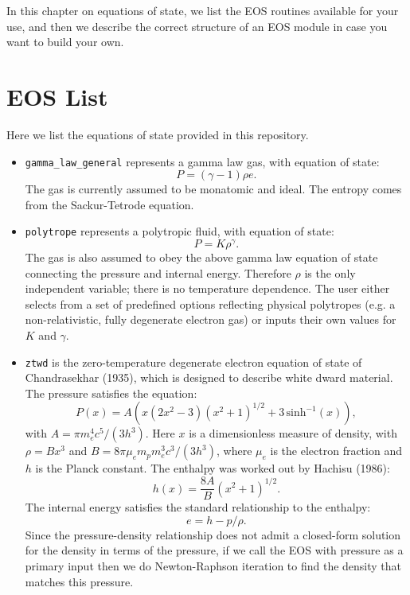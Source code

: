 
In this chapter on equations of state, we list the EOS routines
available for your use, and then we describe the correct structure of
an EOS module in case you want to build your own.

\section{EOS List}

Here we list the equations of state provided in this repository.

\begin{itemize}

\item {\tt gamma\_law\_general} represents a gamma law gas, with
  equation of state:
\begin{equation}
  P = (\gamma - 1) \rho e.
\end{equation}
The gas is currently assumed to be monatomic and ideal. The entropy
comes from the Sackur-Tetrode equation.

\item {\tt polytrope} represents a polytropic fluid, with equation of
  state:
\begin{equation}
  P = K \rho^\gamma.
\end{equation}
The gas is also assumed to obey the above gamma law equation of state
connecting the pressure and internal energy. Therefore $\rho$ is the
only independent variable; there is no temperature dependence. The
user either selects from a set of predefined options reflecting
physical polytropes (e.g. a non-relativistic, fully degenerate
electron gas) or inputs their own values for $K$ and $\gamma$.

\item {\tt ztwd} is the zero-temperature degenerate electron equation
  of state of Chandrasekhar (1935), which is designed to describe
  white dward material. The pressure satisfies the equation:
\begin{equation}
  P(x) = A \left( x(2x^2-3)(x^2 + 1)^{1/2} + 3\, \text{sinh}^{-1}(x) \right),
\end{equation}
with $A = \pi m_e^4 c^5 / (3 h^3)$. Here $x$ is a dimensionless
measure of density, with $\rho = B x^3$ and $B = 8\pi \mu_e m_p m_e^3
c^3 / (3h^3)$, where $\mu_e$ is the electron fraction and $h$ is the
Planck constant. The enthalpy was worked out by Hachisu (1986):
\begin{equation}
  h(x) = \frac{8A}{B}\left(x^2 + 1\right)^{1/2}.
\end{equation}
The internal energy satisfies the standard relationship to the enthalpy:
\begin{equation}
  e = h - p / \rho.
\end{equation}
Since the pressure-density relationship does not admit a closed-form
solution for the density in terms of the pressure, if we call the EOS
with pressure as a primary input then we do Newton-Raphson iteration
to find the density that matches this pressure.


\end{itemize}
